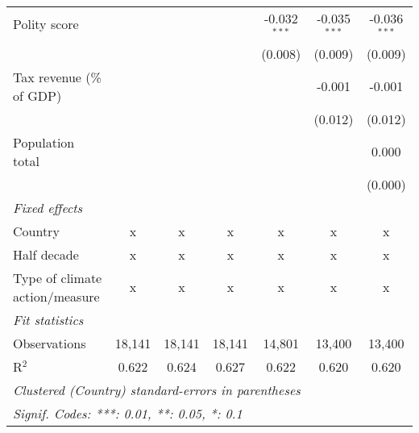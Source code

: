 \begin{tabular}{lcccccc}
   Polity score                                                       &                &              &               & -0.032$^{***}$ & -0.035$^{***}$ & -0.036$^{***}$\\   
                                                                      &                &              &               & (0.008)        & (0.009)        & (0.009)\\   
   Tax revenue (\% of GDP)                                            &                &              &               &                & -0.001         & -0.001\\   
                                                                      &                &              &               &                & (0.012)        & (0.012)\\   
   Population total                                                   &                &              &               &                &                & 0.000\\   
                                                                      &                &              &               &                &                & (0.000)\\   
   \emph{Fixed effects}\\
   Country                                                            & x              & x            & x             & x              & x              & x\\  
   Half decade                                                        & x              & x            & x             & x              & x              & x\\  
   Type of climate action/measure                                     & x              & x            & x             & x              & x              & x\\  
   \midrule \emph{Fit statistics}\\
   Observations                                                       & 18,141         & 18,141       & 18,141        & 14,801         & 13,400         & 13,400\\  
   R$^2$                                                              & 0.622          & 0.624        & 0.627         & 0.622          & 0.620          & 0.620\\  
   \midrule
   \multicolumn{7}{l}{\emph{Clustered (Country) standard-errors in parentheses}}\\
   \multicolumn{7}{l}{\emph{Signif. Codes: ***: 0.01, **: 0.05, *: 0.1}}\\
\end{tabular}
\par\endgroup


